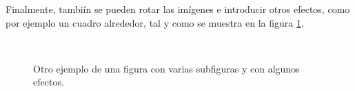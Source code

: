 Finalmente, tambiín se pueden rotar las imígenes e introducir otros efectos, como por ejemplo un cuadro alrededor, tal y como se muestra en la figura \ref{fig:subfiguras2}.
\begin{figure}[H]
\begin{center}
    \hspace{3em} %
    \\
    \caption{Otro ejemplo de una figura con varias subfiguras y con algunos efectos.}
    \label{fig:subfiguras2}
\end{center}
\end{figure}
